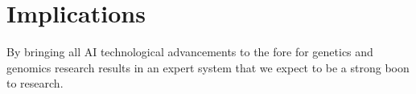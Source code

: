 \section{Implications}
By bringing all AI technological advancements to the fore for genetics and genomics research results in an expert system that we expect to be a strong boon to research.